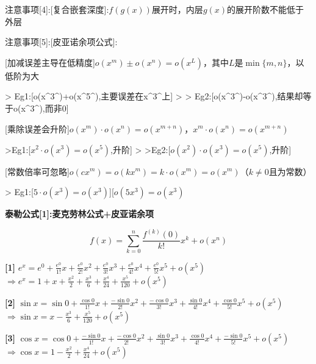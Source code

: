 \documentclass[11pt,a4paper,UTF8]{ctexart}
\begin{document}
    注意事项[4]:[复合嵌套深度]:$f(g(x))$展开时，内层$g(x)$的展开阶数不能低于外层

    注意事项[5]:[皮亚诺余项公式]:

    [加减误差主导在低精度]$o(x^m) \pm o(x^n) = o(x^L)$，其中$L$是$\min\{m, n\}$，以低阶为大

\begin{solbox}[{分步推导与答题规范}]
    >   Eg1:[o(x\textasciicircum{}3\textasciicircum{})+o(x\textasciicircum{}5\textasciicircum{}),主要误差在x\textasciicircum{}3\textasciicircum{}上]	
    >
    >   Eg2:[o(x\textasciicircum{}3\textasciicircum{})-o(x\textasciicircum{}3\textasciicircum{}),结果却等于o(x\textasciicircum{}3\textasciicircum{}),而非0]
\end{solbox}

    [乘除误差会升阶]$o(x^m) \cdot o(x^n) = o(x^{m+n})$，$x^m \cdot o(x^n) = o(x^{m+n})$

\begin{solbox}[{分步推导与答题规范}]
    >Eg1:[$x^2 \cdot o(x^3) = o(x^5)$,升阶]
    >
    >Eg2:[$o(x^2) \cdot o(x^3) = o(x^5)$,升阶]
\end{solbox}

    [常数倍率可忽略]$o(c x^m) = o(k x^m) = k \cdot o(x^m) = o(x^m)$（$k \neq 0$且为常数）

\begin{solbox}[{分步推导与答题规范}]
    >   Eg1:[$5 \cdot o(x^3) = o(x^3)$][$o(5x^3) = o(x^3)$
\end{solbox}

    \textbf{泰勒公式[1]:麦克劳林公式+皮亚诺余项}


\begin{equation*}
f(x) = \sum_{k=0}^{n} \frac{f^{(k)}(0)}{k!} x^k + o(x^n)
\end{equation*}

\textbf{[1]} $e^x = e^0 + \frac{e^0}{1!}x + \frac{e^0}{2!}x^2 + \frac{e^0}{3!}x^3 + \frac{e^0}{4!}x^4 + \frac{e^0}{5!}x^5 + o(x^5)$		$\Rightarrow e^x = 1 + x + \frac{x^2}{2} + \frac{x^3}{6} + \frac{x^4}{24} + \frac{x^5}{120} + o(x^5)$

\textbf{[2]} $\sin x = \sin 0 + \frac{\cos 0}{1!}x + \frac{-\sin 0}{2!}x^2 + \frac{-\cos 0}{3!}x^3 + \frac{\sin 0}{4!}x^4 + \frac{\cos 0}{5!}x^5 + o(x^5)$ $\Rightarrow \sin x = x - \frac{x^3}{6} + \frac{x^5}{120} + o(x^5)$

\textbf{[3]} $\cos x = \cos 0 + \frac{-\sin 0}{1!}x + \frac{-\cos 0}{2!}x^2 + \frac{\sin 0}{3!}x^3 + \frac{\cos 0}{4!}x^4 + \frac{-\sin 0}{5!}x^5 + o(x^5)$ $\Rightarrow \cos x = 1 - \frac{x^2}{2} + \frac{x^4}{24} + o(x^5)$
\end{document}
